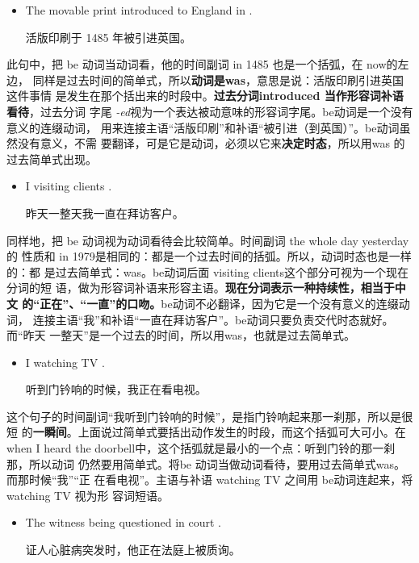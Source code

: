 \begin{itemize}
\item  The movable print  introduced to England in .

  活版印刷于 1485 年被引进英国。
\end{itemize}

此句中，把 be 动词当动词看，他的时间副词 in 1485 也是一个括弧，在 now的左边，
同样是过去时间的简单式，所以\textbf{动词是was}，意思是说：活版印刷引进英国这件事情
是发生在那个括出来的时段中。\textbf{过去分词introduced 当作形容词补语看待}，过去分词
字尾 \emph{-ed}视为一个表达被动意味的形容词字尾。be动词是一个没有意义的连缀动词，
用来连接主语“活版印刷”和补语“被引进（到英国）”。be动词虽然没有意义，不需
要翻译，可是它是动词，必须以它来\textbf{决定时态}，所以用was 的过去简单式出现。

\begin{itemize}
\item  I  visiting clients  .

  昨天一整天我一直在拜访客户。
\end{itemize}

同样地，把 be 动词视为动词看待会比较简单。时间副词 the whole day yesterday 的
性质和 in 1979是相同的：都是一个过去时间的括弧。所以，动词时态也是一样的：都
是过去简单式：was。be动词后面 visiting clients这个部分可视为一个现在分词的短
语，做为形容词补语来形容主语。\textbf{现在分词表示一种持续性，相当于中文
  的“正在”、“一直”的口吻。}be动词不必翻译，因为它是一个没有意义的连缀动词，
连接主语“我”和补语“一直在拜访客户”。be动词只要负责交代时态就好。而“昨天
一整天”是一个过去的时间，所以用was，也就是过去简单式。

\begin{itemize}
\item I  watching TV  .

听到门钤响的时候，我正在看电视。
\end{itemize}

这个句子的时间副词“我听到门铃响的时候”，是指门铃响起来那一刹那，所以是很短
的\textbf{一瞬间}。上面说过简单式要括出动作发生的时段，而这个括弧可大可小。在when I
heard the doorbell中，这个括弧就是最小的一个点：听到门铃的那一刹那，所以动词
仍然要用简单式。将be 动词当做动词看待，要用过去简单式was。而那时候“我”“正
在看电视”。主语与补语 watching TV 之间用 be动词连起来，将 watching TV 视为形
容词短语。

\begin{itemize}
\item  The witness  being questioned in court  .

证人心脏病突发时，他正在法庭上被质询。
\end{itemize}

